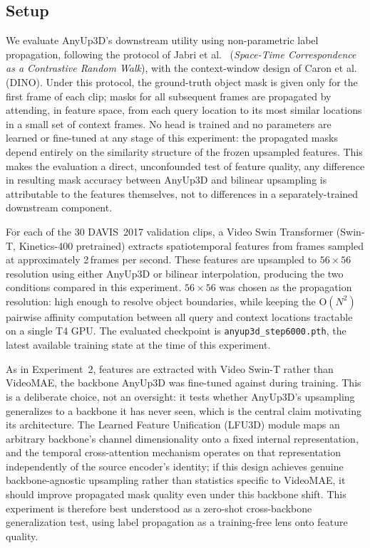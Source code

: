 \subsection{Setup}

We evaluate AnyUp3D's downstream utility using non-parametric label propagation, following the protocol of Jabri et al.~\cite{jabri2020} (\textit{Space-Time Correspondence as a Contrastive Random Walk}), with the context-window design of Caron et al.~\cite{caron2021dino} (DINO).
Under this protocol, the ground-truth object mask is given only for the first frame of each clip; masks for all subsequent frames are propagated by attending, in feature space, from each query location to its most similar locations in a small set of context frames.
No head is trained and no parameters are learned or fine-tuned at any stage of this experiment: the propagated masks depend entirely on the similarity structure of the frozen upsampled features.
This makes the evaluation a direct, unconfounded test of feature quality, any difference in resulting mask accuracy between AnyUp3D and bilinear upsampling is attributable to the features themselves, not to differences in a separately-trained downstream component.

For each of the 30 DAVIS~2017 validation clips, a Video Swin Transformer (Swin-T, Kinetics-400 pretrained) extracts spatiotemporal features from frames sampled at approximately 2\,frames per second.
These features are upsampled to $56 \times 56$ resolution using either AnyUp3D or bilinear interpolation, producing the two conditions compared in this experiment.
$56 \times 56$ was chosen as the propagation resolution: high enough to resolve object boundaries, while keeping the $\mathrm{O}(N^2)$ pairwise affinity computation between all query and context locations tractable on a single T4 GPU.
The evaluated checkpoint is \texttt{anyup3d\_step6000.pth}, the latest available training state at the time of this experiment.

As in Experiment~2, features are extracted with Video Swin-T rather than VideoMAE, the backbone AnyUp3D was fine-tuned against during training.
This is a deliberate choice, not an oversight: it tests whether AnyUp3D's upsampling generalizes to a backbone it has never seen, which is the central claim motivating its architecture.
The Learned Feature Unification (LFU3D) module maps an arbitrary backbone's channel dimensionality onto a fixed internal representation, and the temporal cross-attention mechanism operates on that representation independently of the source encoder's identity; if this design achieves genuine backbone-agnostic upsampling rather than statistics specific to VideoMAE, it should improve propagated mask quality even under this backbone shift.
This experiment is therefore best understood as a zero-shot cross-backbone generalization test, using label propagation as a training-free lens onto feature quality.

